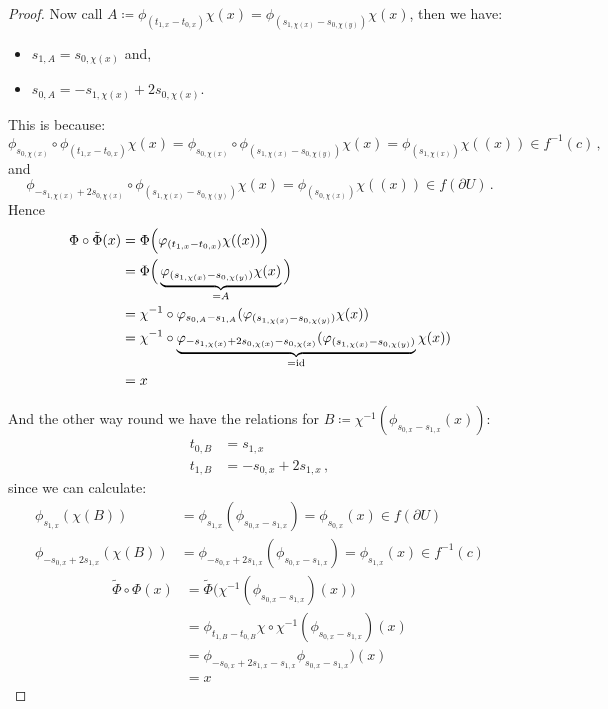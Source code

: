 \begin{proof}
Now call $A\coloneq  \phi_{(t_{1,x}-t_{0,x})}\chi(x)=\phi_{(s_{1,\chi(x)}-s_{0,\chi(y)})}\chi(x)$, then we have:
\begin{itemize}
	\item $s_{1,A}=s_{0,\chi(x)}$ and,
	\item $s_{0,A}=-s_{1,\chi(x)}+2s_{0,\chi(x)}$.
\end{itemize}
This is because:
\begin{equation*}
	\phi_{s_{0,\chi(x)}}\circ \phi_{(t_{1,x}-t_{0,x})}\chi(x)=\phi_{s_{0,\chi(x)}}\circ  \phi_{(s_{1,\chi(x)}-s_{0,\chi(y)})}\chi(x)= \phi_{(s_{1,\chi(x)})}\chi((x)) \in f^{-1}(c)\, ,
\end{equation*} 
and 
\begin{equation*}
	\phi_{-s_{1,\chi(x)}+2s_{0,\chi(x)}}\circ \phi_{(s_{1,\chi(x)}-s_{0,\chi(y)})}\chi(x)= \phi_{(s_{0,\chi(x)})}\chi((x)) \in f(\partial U)\, .
\end{equation*} 
Hence  
\begin{align*}
	\Phi \circ \tilde{\Phi}(x)
	&= 	\Phi\Big( \varphi_{(t_{1,x}-t_{0,x})}\chi((x)) \Big) \\
	&= 	\Phi\Big( \underbrace{\varphi_{(s_{1,\chi(x)}-s_{0,\chi(y)})}\chi(x)}_{=A} \Big) \\
	&=  \chi^{-1}\circ \varphi_{s_{0,A}-s_{1,A}}(\varphi_{(s_{1,\chi(x)}-s_{0,\chi(y)})}\chi(x)) \\
	&=  \chi^{-1}\circ \underbrace{\varphi_{-s_{1,\chi(x)}+2s_{0,\chi(x)} -s_{0,\chi(x)} }(\varphi_{(s_{1,\chi(x)}-s_{0,\chi(y)})}}_{=\text{id}}\chi(x)) \\
	&=  x
\end{align*}

And the other way round we have the relations for $B\coloneq \chi^{-1}(\phi_{s_{0,x}-s_{1,x}}(x))$:
\begin{align*}
	t_{0,B}&=	s_{1,x}\\
	t_{1,B}&=	-s_{0,x}+2s_{1,x}\, , 
\end{align*}
since we can calculate:
\begin{align*}
	\phi_{s_{1,x}}(\chi(B))			  &= \phi_{s_{1,x}}(\phi_{s_{0,x}-s_{1,x}})=\phi_{s_{0,x}}(x)\in f(\partial U)\\
	\phi_{-s_{0,x}+2s_{1,x}}(\chi(B)) &= \phi_{-s_{0,x}+2s_{1,x}}(\phi_{s_{0,x}-s_{1,x}})= \phi_{s_{1,x}}(x) \in f^{-1}(c)
\end{align*}
\begin{align*}
	\tilde{\Phi}\circ \Phi(x)
	&=	\tilde{\Phi} \big( \chi^{-1}(\phi_{s_{0,x}-s_{1,x}})(x) \big)  \\
	&=	\phi_{t_{1,B}-t_{0,B}}\chi \circ \chi^{-1}(\phi_{s_{0,x}-s_{1,x}})(x) \\
	&=  \phi_{	-s_{0,x}+2s_{1,x}-s_{1,x}}\phi_{s_{0,x}-s_{1,x}})(x) \\
	&=  x
\end{align*}


\end{proof}
